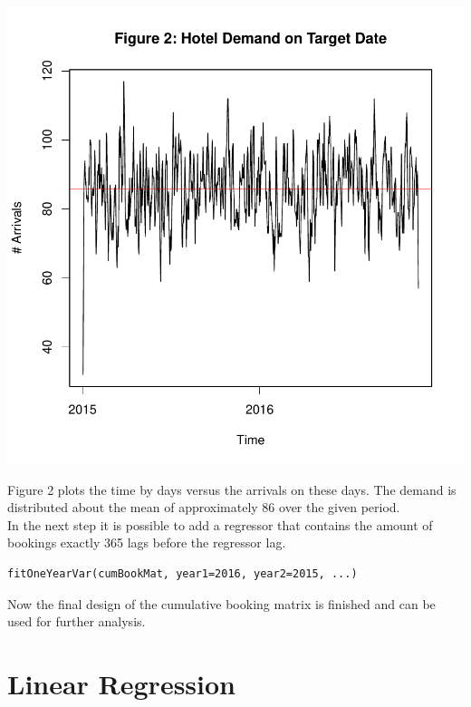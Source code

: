 \documentclass[nojss]{jss}
\begin{document}
\begin{Schunk}
\end{Schunk}
\includegraphics{bookMatrix-tex-003}

Figure 2 plots the time by days versus the arrivals on these days. The demand is distributed about the mean of approximately 86 over the given period.\\
In the next step it is possible to add a regressor that contains the amount of bookings exactly 365 lags before the regressor lag.

\begin{verbatim}
fitOneYearVar(cumBookMat, year1=2016, year2=2015, ...)
\end{verbatim}


Now the final design of the cumulative booking matrix is finished and can be used for further analysis.

\section{Linear Regression}
\end{document}

